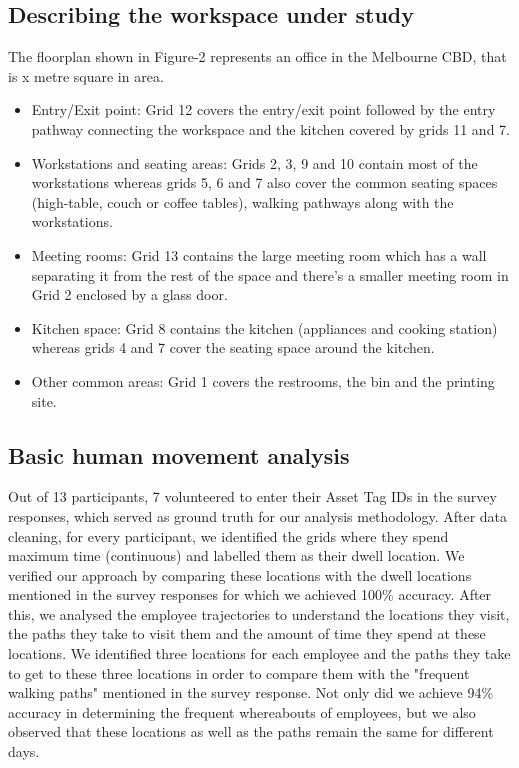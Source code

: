 \documentclass[acmtog]{acmart}
\begin{document}
\subsection{Describing the workspace under study}
The floorplan shown in Figure-2 represents an office in the Melbourne CBD, that is x metre square in area. \begin{itemize}
    \item Entry/Exit point: Grid 12 covers the entry/exit point followed by the entry pathway connecting the workspace and the kitchen covered by grids 11 and 7. 
    \item Workstations and seating areas: Grids 2, 3, 9 and 10 contain most of the workstations whereas grids 5, 6 and 7 also cover the common seating spaces (high-table, couch or coffee tables), walking pathways along with the workstations.
    \item Meeting rooms: Grid 13 contains the large meeting room which has a wall separating it from the rest of the space and there's a smaller meeting room in Grid 2 enclosed by a glass door. 
    \item Kitchen space: Grid 8 contains the kitchen (appliances and cooking station) whereas grids 4 and 7 cover the seating space around the kitchen. 
    \item Other common areas: Grid 1 covers the restrooms, the bin and the printing site. 
\end{itemize}



\subsection{Basic human movement analysis}
Out of 13 participants, 7 volunteered to enter their Asset Tag IDs in the survey responses, which served as ground truth for our analysis methodology. After data cleaning, for every participant, we identified the grids where they spend maximum time (continuous) and labelled them as their dwell location. We verified our approach by comparing these locations with the dwell locations mentioned in the survey responses for which we achieved 100\% accuracy. After this, we analysed the employee trajectories to understand the locations they visit, the paths they take to visit them and the amount of time they spend at these locations. We identified three locations for each employee and the paths they take to get to these three locations in order to compare them with the "frequent walking paths" mentioned in the survey response. Not only did we achieve 94\% accuracy in determining the frequent whereabouts of employees, but we also observed that these locations as well as the paths remain the same for different days.
\end{document}
